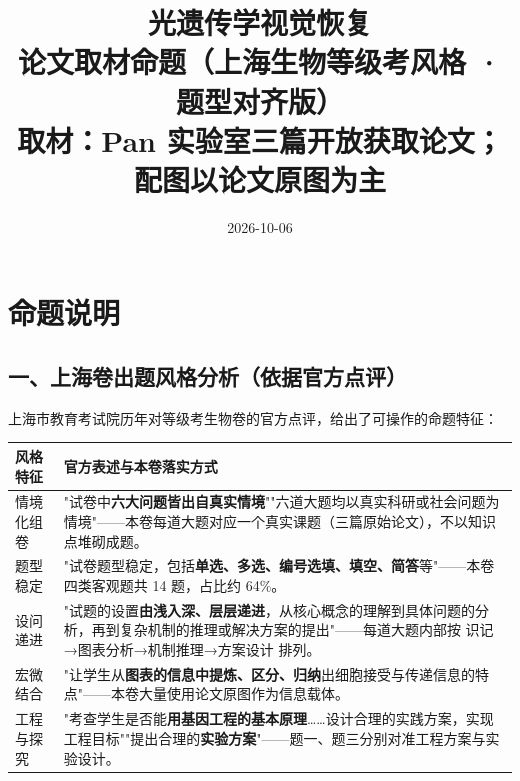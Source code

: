 \documentclass[UTF8,a4paper,11pt]{ctexart}
\title{\bfseries 光遗传学视觉恢复\\[4pt]\large 论文取材命题（上海生物等级考风格 · 题型对齐版）\\[6pt]
\normalsize 取材：Pan 实验室三篇开放获取论文；配图以论文原图为主}
\author{}
\date{2026-10-06}
\begin{document}
\maketitle
\thispagestyle{fancy}

\begin{center}
\end{center}

\section*{命题说明}

\subsection*{一、上海卷出题风格分析（依据官方点评）}

上海市教育考试院历年对等级考生物卷的官方点评，给出了可操作的命题特征：

\begin{longtable}{@{}p{3.4cm}p{11.4cm}@{}}
\toprule
\textbf{风格特征} & \textbf{官方表述与本卷落实方式} \\
\midrule
\endhead
情境化组卷 & "试卷中\textbf{六大问题皆出自真实情境}""六道大题均以真实科研或社会问题为情境"——本卷每道大题对应一个真实课题（三篇原始论文），不以知识点堆砌成题。 \\
题型稳定 & "试卷题型稳定，包括\textbf{单选、多选、编号选填、填空、简答}等"——本卷四类客观题共 14 题，占比约 64\%。 \\
设问递进 & "试题的设置\textbf{由浅入深、层层递进}，从核心概念的理解到具体问题的分析，再到复杂机制的推理或解决方案的提出"——每道大题内部按 识记→图表分析→机制推理→方案设计 排列。 \\
宏微结合 & "让学生从\textbf{图表的信息中提炼、区分、归纳}出细胞接受与传递信息的特点"——本卷大量使用论文原图作为信息载体。 \\
工程与探究 & "考查学生是否能\textbf{用基因工程的基本原理}……设计合理的实践方案，实现工程目标""提出合理的\textbf{实验方案}"——题一、题三分别对准工程方案与实验设计。 \\
\bottomrule
\end{longtable}
\end{document}

